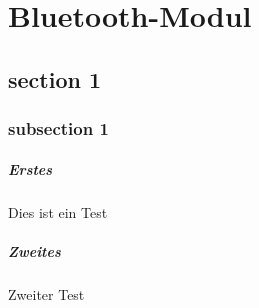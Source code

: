 \chapter{Bluetooth-Modul}
\section{section 1}
\subsection{subsection 1}
\paragraph{Erstes}
Dies ist ein Test
\paragraph{Zweites}
Zweiter Test